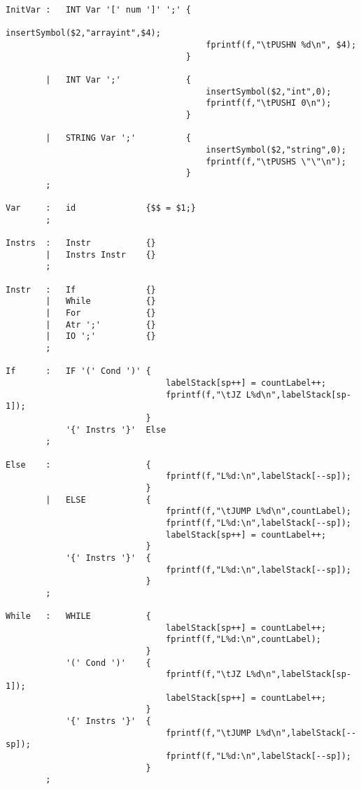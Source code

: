 \documentclass{report}
\begin{document}
\begin{verbatim}
InitVar :   INT Var '[' num ']' ';' {
                                        insertSymbol($2,"arrayint",$4);
                                        fprintf(f,"\tPUSHN %d\n", $4);
                                    }
                                        
        |   INT Var ';'             {
                                        insertSymbol($2,"int",0);
                                        fprintf(f,"\tPUSHI 0\n");
                                    }

        |   STRING Var ';'          {
                                        insertSymbol($2,"string",0);
                                        fprintf(f,"\tPUSHS \"\"\n");
                                    }
        ;

Var     :   id              {$$ = $1;}
        ;

Instrs  :   Instr           {}
        |   Instrs Instr    {}
        ;    

Instr   :   If              {}
        |   While           {}
        |   For             {}
        |   Atr ';'         {}
        |   IO ';'          {}
        ;

If      :   IF '(' Cond ')' {
                                labelStack[sp++] = countLabel++;
                                fprintf(f,"\tJZ L%d\n",labelStack[sp-1]);
                            }
            '{' Instrs '}'  Else
        ;

Else    :                   {    
                                fprintf(f,"L%d:\n",labelStack[--sp]);
                            }
        |   ELSE            {
                                fprintf(f,"\tJUMP L%d\n",countLabel);
                                fprintf(f,"L%d:\n",labelStack[--sp]);
                                labelStack[sp++] = countLabel++;
                            } 
            '{' Instrs '}'  {
                                fprintf(f,"L%d:\n",labelStack[--sp]);
                            }
        ;

While   :   WHILE           {
                                labelStack[sp++] = countLabel++;
                                fprintf(f,"L%d:\n",countLabel);
                            }
            '(' Cond ')'    {
                                fprintf(f,"\tJZ L%d\n",labelStack[sp-1]);
                                labelStack[sp++] = countLabel++;
                            }
            '{' Instrs '}'  {
                                fprintf(f,"\tJUMP L%d\n",labelStack[--sp]);
                                fprintf(f,"L%d:\n",labelStack[--sp]);
                            }
        ;


\end{verbatim}
\end{document}
